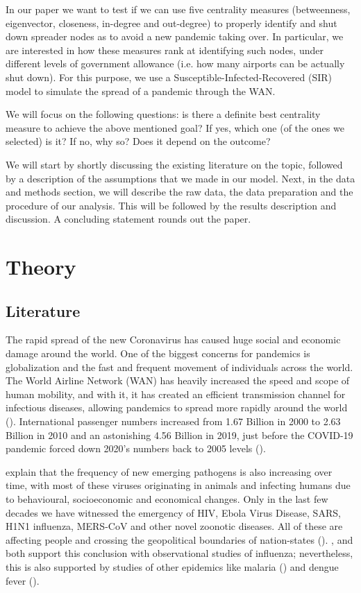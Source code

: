 \documentclass{Template_resources/netsci-project}
\begin{document}
In our paper we want to test if we can use five centrality measures (betweenness, eigenvector, closeness, in-degree and out-degree) to properly identify and shut down spreader nodes as to avoid a new pandemic taking over. In particular, we are interested in how these measures rank at identifying such nodes, under different levels of government allowance (i.e. how many airports can be actually shut down). For this purpose, we use a Susceptible-Infected-Recovered (SIR) model to simulate the spread of a pandemic through the WAN. 

We will focus on the following questions: is there a definite best centrality measure to achieve the above mentioned goal? If yes, which one (of the ones we selected) is it? If no, why so? Does it depend on the outcome?

We will start by shortly discussing the existing literature on the topic, followed by a description of the assumptions that we made in our model. Next, in the data and methods section, we will describe the raw data, the data preparation and the procedure of our analysis. This will be followed by the results description and discussion. A concluding statement rounds out the paper.


\section{Theory}
\subsection{Literature}
The rapid spread of the new Coronavirus has caused huge social and economic damage around the world. One of the biggest concerns for pandemics is globalization and the fast and frequent movement of individuals across the world. The World Airline Network (WAN) has heavily increased the speed and scope of human mobility, and with it, it has created an efficient transmission channel for infectious diseases, allowing pandemics to spread more rapidly around the world (\cite{Lawyer2016}). International passenger numbers increased from 1.67 Billion in 2000 to 2.63 Billion in 2010 and an astonishing 4.56 Billion in 2019, just before the COVID-19 pandemic forced down 2020's numbers back to 2005 levels (\cite{WorldBank}).

\cite{Morse2012} explain that the frequency of new emerging pathogens is also increasing over time, with most of these viruses originating in animals and infecting humans due to behavioural, socioeconomic and economical changes. Only in the last few decades we have witnessed the emergency of HIV, Ebola Virus Disease, SARS, H1N1 influenza, MERS-CoV and other novel zoonotic diseases. All of these are affecting people and crossing the geopolitical boundaries of nation-states (\cite{MartinBoland2018}). \cite{Balcan2009}, and \cite{Brockmann2013} both support this conclusion with observational studies of influenza; nevertheless, this is also supported by studies of other epidemics like malaria (\cite{Hunag2013}) and dengue fever (\cite{Semanza2014}).
\end{document}
